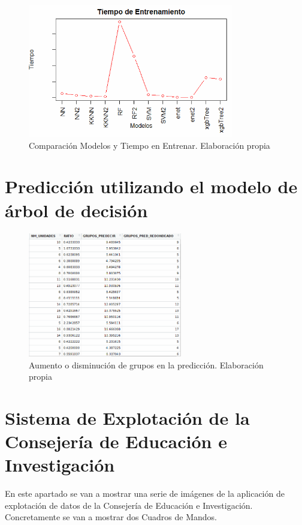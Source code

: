 \begin{subappendices}
\begin{figure}[htb]
	\centering
	\caption{Comparación Modelos y Tiempo en Entrenar. Elaboración propia}
	\label{fig:ComparacionModelosTiempo}
	\includegraphics[width=0.8\textwidth]{recursos/ImagenesR/ComparacionModelosTiempo}
\end{figure}
\FloatBarrier

\section{Predicción utilizando el modelo de árbol de decisión}

\begin{figure}[htb]
	\centering
	\caption{Aumento o disminución de grupos en la predicción. Elaboración propia}
	\label{fig:UnidadesDistintasPrediccion}
	\includegraphics[width=0.6\textwidth]{recursos/ImagenesR/UnidadesDistintasPrediccion}
\end{figure}
\FloatBarrier

\section{Sistema de Explotación de la Consejería de Educación e Investigación}
	\label{appendix:BC}
En este apartado se van a mostrar una serie de imágenes de la aplicación de explotación de datos de la Consejería de Educación e Investigación. Concretamente se van a mostrar dos Cuadros de Mandos.


\end{subappendices}
